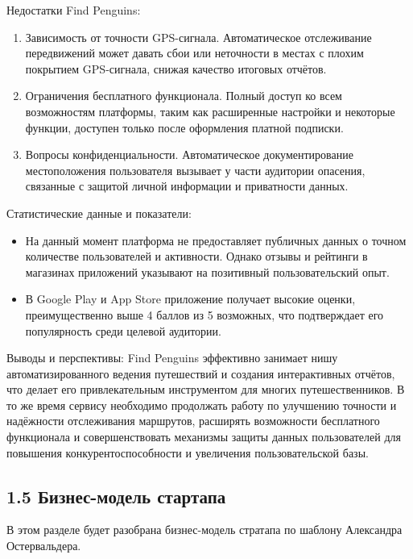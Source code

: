 Недостатки Find Penguins:
\begin{enumerate}
    \item Зависимость от точности GPS-сигнала. Автоматическое отслеживание передвижений может давать сбои или неточности в местах с плохим покрытием GPS-сигнала, снижая качество итоговых отчётов.
    \item Ограничения бесплатного функционала. Полный доступ ко всем возможностям платформы, таким как расширенные настройки и некоторые функции, доступен только после оформления платной подписки.
    \item Вопросы конфиденциальности. Автоматическое документирование местоположения пользователя вызывает у части аудитории опасения, связанные с защитой личной информации и приватности данных.
\end{enumerate}

Статистические данные и показатели:
\begin{itemize}
    \item На данный момент платформа не предоставляет публичных данных о точном количестве пользователей и активности. Однако отзывы и рейтинги в магазинах приложений указывают на позитивный пользовательский опыт.
    \item В Google Play и App Store приложение получает высокие оценки, преимущественно выше 4 баллов из 5 возможных, что подтверждает его популярность среди целевой аудитории.
\end{itemize}

Выводы и перспективы:
Find Penguins эффективно занимает нишу автоматизированного ведения путешествий и создания интерактивных отчётов, что делает его привлекательным инструментом для многих путешественников. В то же время сервису необходимо продолжать работу по улучшению точности и надёжности отслеживания маршрутов, расширять возможности бесплатного функционала и совершенствовать механизмы защиты данных пользователей для повышения конкурентоспособности и увеличения пользовательской базы.

\subsection*{1.5 Бизнес-модель стартапа}
В этом разделе будет разобрана бизнес-модель стратапа по шаблону Александра Остервальдера.

